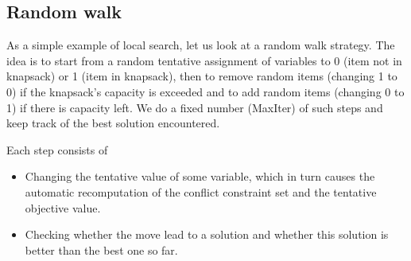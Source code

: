 \newpage
\subsection{Random walk}

As a simple example of local search, let us look at a random walk
strategy.  The idea is to start from a random tentative assignment of
variables to 0 (item not in knapsack) or 1 (item in knapsack), then to
remove random items (changing 1 to 0) if the knapsack's capacity is
exceeded and to add random items (changing 0 to 1) if there is
capacity left.  We do a fixed number (MaxIter) of such steps and keep
track of the best solution encountered.

Each step consists of
\begin{itemize}
\item Changing the tentative value of some variable, which in turn causes
        the automatic recomputation of the conflict constraint set
        and the tentative objective value.
\item Checking whether the move lead to a solution and whether this
        solution is better than the best one so far.
\end{itemize}


